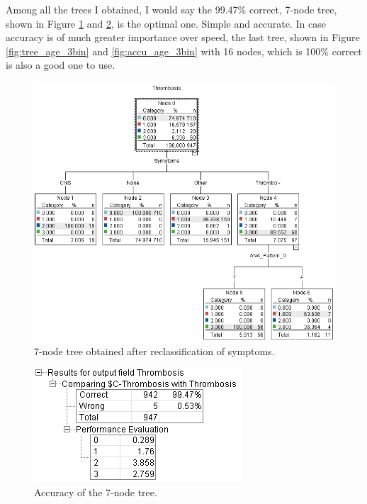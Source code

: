 \documentclass[12pt]{article}
\begin{document}
Among all the trees I obtained, I would say the 99.47\% correct, 7-node tree, shown in Figure \ref{fig:tree_symptom_reclassified} and \ref{fig:accu_symptom_reclassified}, is the optimal one. Simple and accurate. In case accuracy is of much greater importance over speed, the last tree, shown in Figure \ref{fig:tree_age_3bin} and \ref{fig:accu_age_3bin} with 16 nodes, which is 100\% correct is also a good one to use.

\begin{figure}[!ht]
\begin{center}
\includegraphics[width=\textwidth]{fig/tree_symptom_reclassified.png}
\caption{7-node tree obtained after reclassification of symptoms.}
\label{fig:tree_symptom_reclassified}
\end{center}
\end{figure}

\begin{figure}[!hb]
\begin{center}
\includegraphics[scale=1]{fig/accu_symptom_reclassified.png}
\caption{Accuracy of the 7-node tree.}
\label{fig:accu_symptom_reclassified}
\end{center}
\end{figure}
\end{document}
